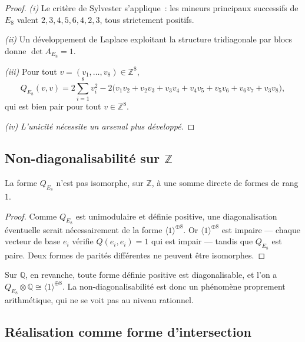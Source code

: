 \begin{proof}
  \textit{(i)} Le critère de Sylvester s'applique~: les mineurs principaux successifs de
  $E_8$ valent $2, 3, 4, 5, 6, 4, 2, 3$, tous strictement positifs.

  \textit{(ii)} Un développement de Laplace exploitant la structure tridiagonale par blocs
  donne $\det A_{E_8} = 1$.

  \textit{(iii)} Pour tout $v = (v_1, \ldots, v_8) \in \mathbb{Z}^8$,
  \[
    Q_{E_8}(v,v) = 2\sum_{i=1}^8 v_i^2
    - 2\bigl(v_1 v_2 + v_2 v_3 + v_3 v_4 + v_4 v_5 + v_5 v_6 + v_6 v_7 + v_3 v_8\bigr),
  \]
  qui est bien pair pour tout $v \in \mathbb{Z}^8$.

  \textit{(iv)} \textit{L'unicité nécessite un arsenal plus développé.}
\end{proof}

\subsection{Non-diagonalisabilité sur \texorpdfstring{$\mathbb{Z}$}{Z}}

\begin{proposition}\label{prop:e8_non_diag}
  La forme $Q_{E_8}$ n'est pas isomorphe, sur $\mathbb{Z}$, à une somme directe de formes
  de rang $1$.
\end{proposition}

\begin{proof}
  Comme $Q_{E_8}$ est unimodulaire et définie positive, une diagonalisation éventuelle serait
  nécessairement de la forme $\langle 1 \rangle^{\oplus 8}$. Or $\langle 1 \rangle^{\oplus 8}$
  est impaire — chaque vecteur de base $e_i$ vérifie $Q(e_i, e_i) = 1$ qui est impair —
  tandis que $Q_{E_8}$ est paire. Deux formes de parités différentes ne peuvent être
  isomorphes.
\end{proof}

\begin{remark}
  Sur $\mathbb{Q}$, en revanche, toute forme définie positive est diagonalisable, et l'on a
  $Q_{E_8} \otimes \mathbb{Q} \cong \langle 1 \rangle^{\oplus 8}$. La non-diagonalisabilité
  est donc un phénomène proprement arithmétique, qui ne se voit pas au niveau rationnel.
\end{remark}

\subsection{Réalisation comme forme d'intersection}

